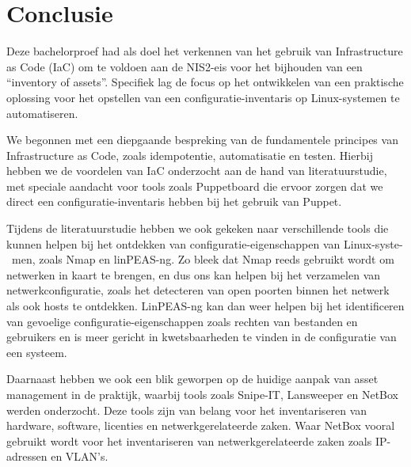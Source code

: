 
\chapter{Conclusie}%
\label{ch:conclusie}


Deze bachelorproef had als doel het verkennen van het gebruik van Infrastructure as Code (IaC) om te voldoen aan de NIS2-eis voor het bijhouden van een ``inventory of assets''.
Specifiek lag de focus op het ontwikkelen van een praktische oplossing voor het opstellen van een configuratie-inventaris op Linux-systemen te automatiseren.

We begonnen met een diepgaande bespreking van de fundamentele principes van Infrastructure as Code, zoals idempotentie, automatisatie en testen.
Hierbij hebben we de voordelen van IaC onderzocht aan de hand van literatuurstudie, met speciale aandacht voor tools zoals Puppetboard die ervoor zorgen dat we direct een configuratie-inventaris hebben bij het gebruik van Puppet.

Tijdens de literatuurstudie hebben we ook gekeken naar verschillende tools die kunnen helpen bij het ontdekken van configuratie-eigenschappen van Linux-syste-\ men, zoals Nmap en linPEAS-ng.
Zo bleek dat Nmap reeds gebruikt wordt om netwerken in kaart te brengen, en dus ons kan helpen bij het verzamelen van netwerkconfiguratie, zoals het detecteren van open poorten binnen het netwerk als ook hosts te ontdekken.
LinPEAS-ng kan dan weer helpen bij het identificeren van gevoelige configuratie-eigenschappen zoals rechten van bestanden en gebruikers en is meer gericht in kwetsbaarheden te vinden in de configuratie van een systeem.

Daarnaast hebben we ook een blik geworpen op de huidige aanpak van asset management in de praktijk, waarbij tools zoals Snipe-IT, Lansweeper en NetBox werden onderzocht.
Deze tools zijn van belang voor het inventariseren van hardware, software, licenties en netwerkgerelateerde zaken.
Waar NetBox vooral gebruikt wordt voor het inventariseren van netwerkgerelateerde zaken zoals IP-adressen en VLAN's.

